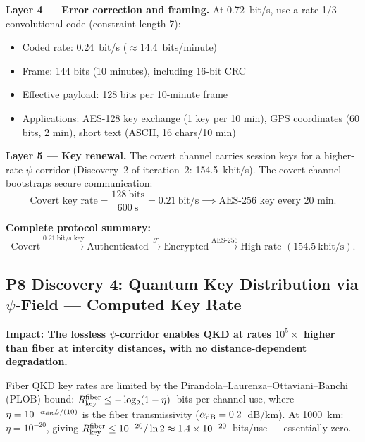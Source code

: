 \documentclass[aps,prd,twocolumn,superscriptaddress,nofootinbib]{revtex4-2}
\newcommand{\Fingerprint}{\mathcal{F}}
\begin{document}
\textbf{Layer 4 --- Error correction and framing.}
At 0.72~bit/s, use a rate-1/3 convolutional code (constraint length 7):
\begin{itemize}
\item Coded rate: 0.24~bit/s ($\approx$14.4~bits/minute)
\item Frame: 144 bits (10 minutes), including 16-bit CRC
\item Effective payload: 128 bits per 10-minute frame
\item Applications: AES-128 key exchange (1 key per 10 min),
GPS coordinates (60 bits, 2 min), short text (ASCII, 16 chars/10 min)
\end{itemize}

\textbf{Layer 5 --- Key renewal.}
The covert channel carries session keys for a higher-rate
$\psi$-corridor (Discovery~2 of iteration~2: 154.5~kbit/s).
The covert channel bootstraps secure communication:
\begin{equation}
\text{Covert key rate} = \frac{128~\text{bits}}{600~\text{s}}
= 0.21~\text{bit/s} \implies \text{AES-256 key every 20 min}.
\end{equation}

\textbf{Complete protocol summary:}
\begin{equation}
\boxed{
\text{Covert}\xrightarrow{0.21~\text{bit/s key}}
\text{Authenticated}\xrightarrow{\Fingerprint}
\text{Encrypted}\xrightarrow{\text{AES-256}}
\text{High-rate } (154.5~\text{kbit/s}).
}
\end{equation}

\subsection{P8 Discovery 4: Quantum Key Distribution via $\psi$-Field
--- Computed Key Rate}

\textbf{Impact: The lossless $\psi$-corridor enables QKD at rates
$10^5\times$ higher than fiber at intercity distances, with no
distance-dependent degradation.}

Fiber QKD key rates are limited by the Pirandola--Laurenza--Ottaviani--Banchi
(PLOB) bound: $R_{\rm key}^{\rm fiber} \leq -\log_2(1-\eta)$~bits
per channel use, where $\eta = 10^{-\alpha_{\rm dB}L/(10)}$ is the
fiber transmissivity ($\alpha_{\rm dB} = 0.2$~dB/km).  At 1000~km:
$\eta = 10^{-20}$, giving $R_{\rm key}^{\rm fiber} \leq
10^{-20}/\ln 2 \approx 1.4\times10^{-20}$~bits/use --- essentially zero.
\end{document}
